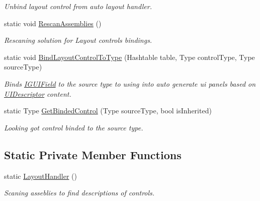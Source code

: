\begin{DoxyCompactItemize}
\begin{DoxyCompactList}\small\item\em Unbind layout control from auto layout handler. \end{DoxyCompactList}\item 
static void \mbox{\hyperlink{class_wpf_handler_1_1_u_i_1_1_auto_layout_1_1_layout_handler_a68b385db6f1fb9795be73195401a3175}{Rescan\+Assemblies}} ()
\begin{DoxyCompactList}\small\item\em Rescaning solution for Layout controls bindings. \end{DoxyCompactList}\item 
static void \mbox{\hyperlink{class_wpf_handler_1_1_u_i_1_1_auto_layout_1_1_layout_handler_ad580450c00d9a58be2c85399e7cf4b26}{Bind\+Layout\+Control\+To\+Type}} (Hashtable table, Type control\+Type, Type source\+Type)
\begin{DoxyCompactList}\small\item\em Binds \mbox{\hyperlink{interface_wpf_handler_1_1_u_i_1_1_auto_layout_1_1_i_g_u_i_field}{I\+G\+U\+I\+Field}} to the source type to using into auto generate ui panels based on \mbox{\hyperlink{class_wpf_handler_1_1_u_i_1_1_auto_layout_1_1_u_i_descriptor}{U\+I\+Descriptor}} content. \end{DoxyCompactList}\item 
static Type \mbox{\hyperlink{class_wpf_handler_1_1_u_i_1_1_auto_layout_1_1_layout_handler_adbcbc84c8b00500646fd088f9dfba3c4}{Get\+Binded\+Control}} (Type source\+Type, bool is\+Inherited)
\begin{DoxyCompactList}\small\item\em Looking got control binded to the source type. \end{DoxyCompactList}\end{DoxyCompactItemize}
\subsection*{Static Private Member Functions}
\begin{DoxyCompactItemize}
\item 
static \mbox{\hyperlink{class_wpf_handler_1_1_u_i_1_1_auto_layout_1_1_layout_handler_af5019f7dbd2cfafc9d5c5fce4382ff8f}{Layout\+Handler}} ()
\begin{DoxyCompactList}\small\item\em Scaning asseblies to find descriptions of controls. \end{DoxyCompactList}\end{DoxyCompactItemize}
